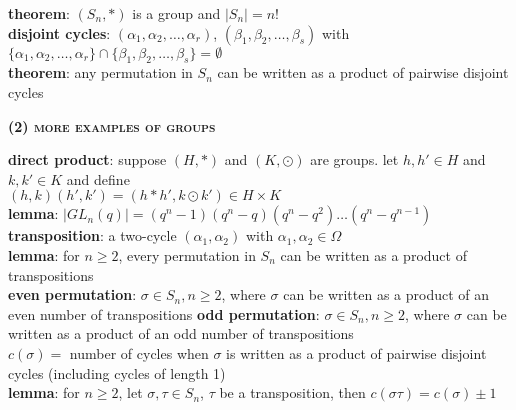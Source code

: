 \documentclass[a4paper]{article}
\newcommand\abs[1]{\ensuremath{\lvert#1\rvert}}
\begin{document}
\begin{multicols}{2}
\begin{framed}
	\noindent
	\textbf{theorem}: $(S_n, *)$ is a group and $\abs{S_n} = n!$\\
	
	\noindent
	\textbf{disjoint cycles}: $(\alpha_1, \alpha_2, \dots, \alpha_r)$, $(\beta_1, \beta_2, \dots, \beta_s)$ with\\
	$\{\alpha_1, \alpha_2, \dots, \alpha_r\} \cap \{\beta_1, \beta_2, \dots, \beta_s\} = \emptyset$\\
	
	\noindent
	\textbf{theorem}: any permutation in $S_n$ can be written as a product of pairwise disjoint cycles
\end{framed}

\begin{framed}
	\begin{center}
		\textbf{\textsc{(2) more examples of groups}}
	\end{center}
	
	\noindent
	\textbf{direct product}: suppose $(H, *)$ and $(K, \odot)$ are groups. let $h, h' \in H$ and $k, k' \in K$ and define\\
	$(h, k)(h', k') = (h * h', k \odot k') \in H \times K$\\
	
	\noindent
	\textbf{lemma}: $\abs{GL_n(q)} = (q^n - 1)(q^n - q)(q^n - q^2) \dots (q^n - q^{n-1})$\\
	
	\noindent
	\textbf{transposition}: a two-cycle $(\alpha_1, \alpha_2)$ with $\alpha_1, \alpha_2 \in \Omega$\\
	
	\noindent
	\textbf{lemma}: for $n \geq 2$, every permutation in $S_n$ can be written as a product of transpositions\\
	
	\noindent
	\textbf{even permutation}: $\sigma \in S_n, n \geq 2$, where $\sigma$ can be written as a product of an even number of transpositions
	\textbf{odd permutation}: $\sigma \in S_n, n \geq 2$, where $\sigma$ can be written as a product of an odd number of transpositions\\
	
	\noindent
	$c(\sigma) =$ number of cycles when $\sigma$ is written as a product of pairwise disjoint cycles (including cycles of length 1)\\
	
	\noindent
	\textbf{lemma}: for $n \geq 2$, let $\sigma, \tau \in S_n$, $\tau$ be a transposition, then $c(\sigma\tau) = c(\sigma) \pm 1$\\


\end{framed}
\end{multicols}
\end{document}
